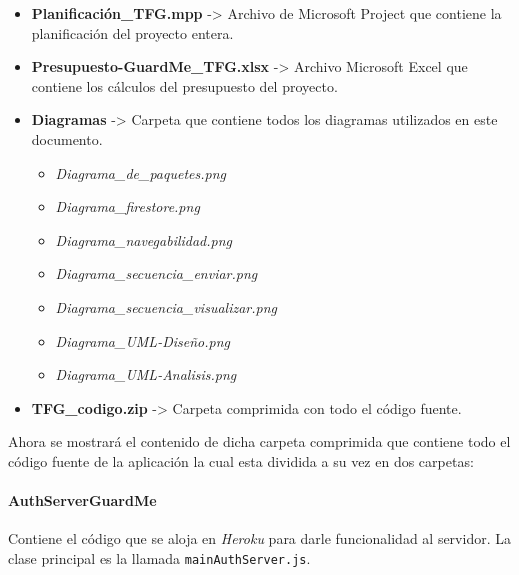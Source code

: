 \documentclass[11pt]{report} %
\begin{document}
\begin{itemize}
	\item \textbf{Planificación\_TFG.mpp} -> Archivo de Microsoft Project que contiene la planificación del proyecto entera.
	\item \textbf{Presupuesto-GuardMe\_TFG.xlsx} -> Archivo Microsoft Excel que contiene los cálculos del presupuesto del proyecto.
	\item \textbf{Diagramas} -> Carpeta que contiene todos los diagramas utilizados en este documento.
	\begin{itemize}
		\item \textit{Diagrama\_de\_paquetes.png}
		\item \textit{Diagrama\_firestore.png}
		\item \textit{Diagrama\_navegabilidad.png}
		\item \textit{Diagrama\_secuencia\_enviar.png}
		\item \textit{Diagrama\_secuencia\_visualizar.png}
		\item \textit{Diagrama\_UML-Diseño.png}
		\item \textit{Diagrama\_UML-Analisis.png}
	\end{itemize}
	\item \textbf{TFG\_codigo.zip} -> Carpeta comprimida con todo el código fuente.
\end{itemize}

Ahora se mostrará el contenido de dicha carpeta comprimida que contiene todo el código fuente de la aplicación la cual esta dividida a su vez en dos carpetas:

\paragraph*{AuthServerGuardMe}
Contiene el código que se aloja en \textit{Heroku} para darle funcionalidad al servidor. La clase principal es la llamada \texttt{mainAuthServer.js}.
\end{document}
